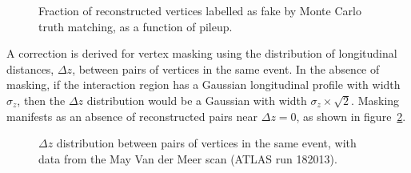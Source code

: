 \begin{figure}[h]
{		\label{fig:fake-mu-murecmc}
	}
	\caption{Fraction of reconstructed vertices labelled as fake by Monte Carlo truth matching, as a function of pileup.}
	\label{fig:fake-fractions}
\end{figure}


A correction is derived for vertex masking using the distribution of longitudinal distances, $\Delta z$, between pairs of vertices in the same event. In the absence of masking, if the interaction region has a Gaussian longitudinal profile with width $\sigma_z$, then the $\Delta z$ distribution would be a Gaussian with width $\sigma_z\times\sqrt{2}$. Masking manifests as an absence of reconstructed pairs near $\Delta z=0$, as shown in figure~\ref{fig:reco-luminosity-deltaz}. 

\begin{figure}[h]
	\centering
	\caption{$\Delta z$ distribution between pairs of vertices in the same event, with data from the May Van der Meer scan (ATLAS run 182013).}
	\label{fig:reco-luminosity-deltaz}
\end{figure}


